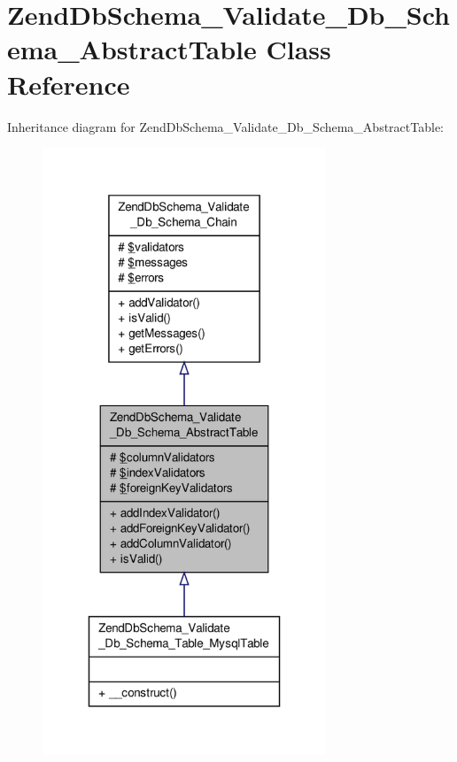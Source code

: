 \hypertarget{classZendDbSchema__Validate__Db__Schema__AbstractTable}{\section{Zend\-Db\-Schema\-\_\-\-Validate\-\_\-\-Db\-\_\-\-Schema\-\_\-\-Abstract\-Table Class Reference}
\label{classZendDbSchema__Validate__Db__Schema__AbstractTable}
}


Inheritance diagram for Zend\-Db\-Schema\-\_\-\-Validate\-\_\-\-Db\-\_\-\-Schema\-\_\-\-Abstract\-Table\-:\nopagebreak
\begin{figure}[H]
\begin{center}
\leavevmode
\includegraphics[width=240pt]{classZendDbSchema__Validate__Db__Schema__AbstractTable__inherit__graph}
\end{center}
\end{figure}


